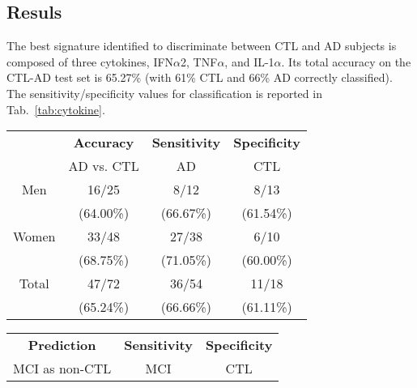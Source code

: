 \documentclass{standalone}
\begin{document}
\subsection[Results]{Resuls}\label{cytokine:cytokine_result}

The best signature identified to discriminate between CTL and AD subjects is composed of three cytokines, IFN$\alpha$2, TNF$\alpha$, and IL-1$\alpha$.
Its total accuracy on the CTL-AD test set is 65.27\% (with 61\% CTL and 66\% AD correctly classified).
The sensitivity/specificity values for classification is reported in Tab.~\ref{tab:cytokine}.

\begin{table}[!htb]
  \begin{minipage}{.5\linewidth}
    \hspace{-1.5cm}
      \begin{tabular}{cccc}
          \hline \rowcolor{darkgrayrow}
                      &  \textbf{Accuracy}  &  \textbf{Sensitivity}  &  \textbf{Specificity} \\
                      &  AD vs. CTL         &  AD                    &    CTL                \\
          \hline
              Men     &    16/25            &    8/12                &    8/13               \\
                      &          (64.00\%)  &         (66.67\%)      &         (61.54\%)     \\
              Women   &    33/48            &   27/38                &    6/10               \\
                      &          (68.75\%)  &         (71.05\%)      &         (60.00\%)     \\
              Total   &    47/72            &   36/54                &   11/18               \\
                      &          (65.24\%)  &         (66.66\%)      &         (61.11\%)     \\
          \hline
      \end{tabular}
  \end{minipage}%
  \begin{minipage}{.5\linewidth}
    \hspace{.5cm}
      \begin{tabular}{ccc}
          \hline \rowcolor{darkgrayrow}
                        \textbf{Prediction} &  \textbf{Sensitivity}  &  \textbf{Specificity} \\
                         MCI as non-CTL     &  MCI                   &    CTL                \\

\end{tabular}
\end{minipage}
\end{table}
\end{document}
